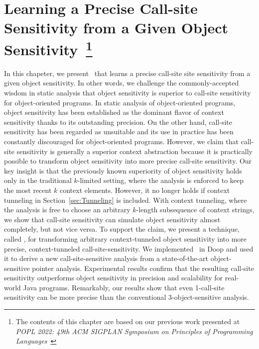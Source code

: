\chapter{Learning a Precise Call-site Sensitivity from a Given Object Sensitivity~\footnote{The contents of this chapter are based on our previous work presented at \emph{POPL 2022: 49th ACM SIGPLAN Symposium on Principles of Programming Languages}~\cite{JeOh22}}}\label{sec:Obj2CFA}


In this chapeter, we present \ourtechnique~that 
learns a precise call-site site sensitivity from a given object sensitivity.
In other words, we challenge the commonly-accepted wisdom in static analysis 
that object sensitivity is superior to call-site sensitivity for object-oriented programs. 
In static analysis of object-oriented programs, object sensitivity
has been established as the dominant flavor of context sensitivity
thanks to its outstanding precision. On the other hand, call-site
sensitivity has been regarded as unsuitable and its use in practice has been 
constantly discouraged for object-oriented programs. 
However, we claim that call-site sensitivity is generally 
a superior context abstraction because it is practically possible to transform 
object sensitivity into more precise call-site sensitivity. 
Our key
insight is that the previously known superiority of object sensitivity holds only
in the traditional $k$-limited setting, where the analysis is enforced
to keep the most recent $k$ context elements. However, it no longer holds if context tunneling in Section~{\ref{sec:Tunneling}} is included.
With context tunneling, where the analysis is free to choose an
arbitrary $k$-length subsequence of context strings, we show that
call-site sensitivity can simulate object sensitivity almost
completely, but not vice versa. To support the claim, we present a
technique, called \ourtechnique, for transforming 
arbitrary context-tunneled object sensitivity into
more precise, context-tunneled call-site-sensitivity.
We implemented \ourtechnique~in Doop and used it to derive a
new call-site-sensitive analysis from a state-of-the-art object-sensitive pointer analysis. 
Experimental results
 confirm that the resulting call-site sensitivity outperforms 
 object sensitivity in precision and scalability for real-world Java programs. 
Remarkably, our results show that even 1-call-site sensitivity can be more precise than the
conventional 3-object-sensitive analysis.









